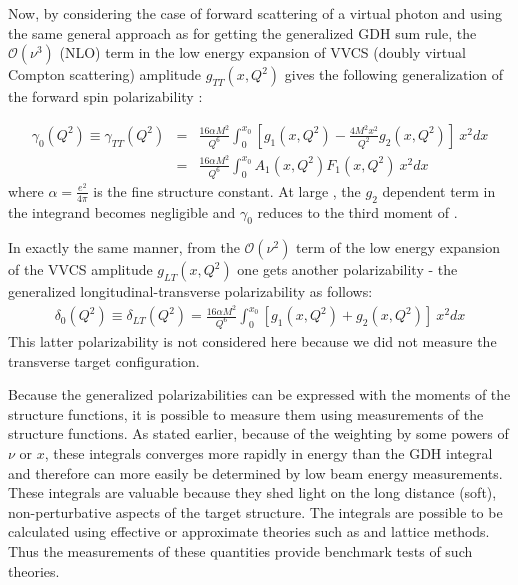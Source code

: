 Now, by considering the case of forward scattering of a virtual photon  %
and using the same general approach as for getting the generalized GDH sum rule, the $\mathcal{O}(\nu^3)$ (NLO) term in the low energy expansion of VVCS (doubly virtual Compton scattering) amplitude $g_{TT}(x,Q^2)$ gives the following generalization of the forward spin polarizability \cite{DrechselPasqVan} \cite{pLeaderKuhnChen}:

\begin{eqnarray}
\label{Gm0Gen}
\gamma_0(Q^2) \equiv \gamma_{TT}(Q^2) &=& \frac{16 \alpha M^2}{Q^6} 
\int^{x_0}_0  \left[ g_1(x,Q^2) - \frac{4 M^2 x^2}{Q^2} g_2(x,Q^2) \right] ~ x^2  dx  \\
\label{Gm0GenAf}
&=& \frac{16 \alpha M^2}{Q^6} \int^{x_0}_0  A_1(x,Q^2)F_1(x,Q^2) ~ x^2  dx 
\end{eqnarray}
where $\alpha = \frac{e^2}{4 \pi}$ is the fine structure constant. At large \qsq, the $g_2$ dependent term in the integrand becomes negligible and $\gamma_0$ reduces to the third moment of \gone \cite{DrechselPasqVan}.

In exactly the same manner, from the $\mathcal{O}(\nu^2) $ term of the low energy expansion of the VVCS amplitude $g_{LT}(x,Q^2)$ one gets another polarizability - the generalized longitudinal-transverse polarizability as follows: %
\begin{eqnarray}
\label{Del0Gen}
\delta_0(Q^2) \equiv \delta_{LT}(Q^2) = \frac{16 \alpha M^2}{Q^6} 
\int^{x_0}_0  \left[ g_1(x,Q^2) + g_2(x,Q^2) \right] ~ x^2  dx 
\end{eqnarray}
This latter polarizability is not considered here because we did not measure the transverse target configuration.

Because the generalized polarizabilities can be expressed with the moments of the structure functions, it is possible to measure them using measurements of the structure functions. As stated earlier, because of the weighting by some powers of $\nu$ or $x$, these integrals converges more rapidly in energy than the GDH integral and therefore can more easily be determined by low beam energy measurements. %
These integrals are valuable because they shed light on the long distance (soft), non-perturbative aspects of the target structure. The integrals are possible to be calculated using effective or approximate theories such as \chipts and lattice methods. Thus the measurements of these quantities provide benchmark tests of such theories.


